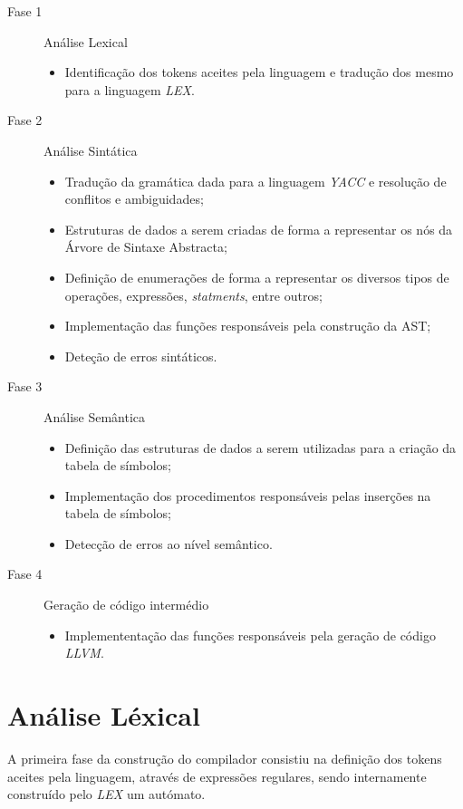 \documentclass[11pt,a4paper]{article}
\begin{document}
\begin{description}
	\item[Fase 1] Análise Lexical
		\begin{itemize}
			\item Identificação dos tokens aceites pela linguagem e tradução dos mesmo para a linguagem \emph{LEX}. 
		\end{itemize}
	\item[Fase 2] Análise Sintática
		\begin{itemize}
			\item Tradução da gramática dada para a linguagem \emph{YACC} e resolução de conflitos e ambiguidades;
			\item Estruturas de dados a serem criadas de forma a representar os nós da Árvore de Sintaxe Abstracta;
			\item Definição de enumerações de forma a representar os diversos tipos de operações,  expressões, \emph{statments}, entre outros;
			\item Implementação das funções responsáveis pela construção da AST;
			\item Deteção de erros sintáticos.
		\end{itemize}
	\item[Fase 3] Análise Semântica
		\begin{itemize}
			\item Definição das estruturas de dados a serem utilizadas para a criação da tabela de símbolos;
			\item Implementação dos procedimentos responsáveis pelas inserções na tabela de símbolos;
			\item Detecção de erros ao nível semântico. 
		\end{itemize}
	\item[Fase 4] Geração de código intermédio
		\begin{itemize}
			\item Implemententação das funções responsáveis pela geração de código \emph{LLVM}.
		\end{itemize}
\end{description}

\newpage

\section{Análise Léxical}

A primeira fase da construção do compilador consistiu na definição dos tokens aceites pela linguagem, através de expressões regulares, sendo internamente construído pelo \emph{LEX} um autómato.


   
\end{document}
